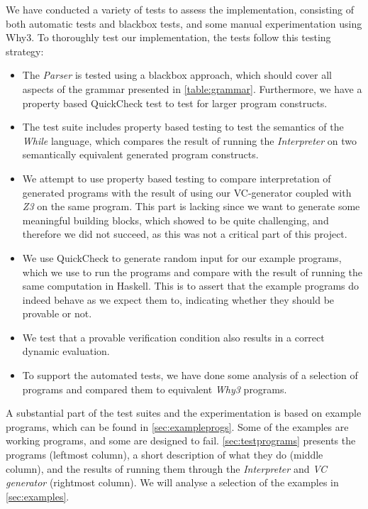 
We have conducted a variety of tests to assess the implementation, consisting of both automatic tests and blackbox tests, and some manual experimentation using Why3.
To thoroughly test our implementation, the tests follow this testing strategy:
\begin{itemize}
	\item The \textit{Parser} is tested using a blackbox approach, which should cover all aspects of the grammar presented in \cref{table:grammar}.
  Furthermore, we have a property based QuickCheck test to test for larger program constructs.
	\item The test suite includes property based testing to test the semantics of the \textit{While} language, which compares the result of running the \textit{Interpreter} on two semantically equivalent generated program constructs.
	\item We attempt to use property based testing to compare interpretation of generated programs with the result of using our VC-generator coupled with \textit{Z3} on the same program. This part is lacking since we want to generate some meaningful building blocks, which showed to be quite challenging, and therefore we did not succeed, as this was not a critical part of this project.
  \item We use QuickCheck to generate random input for our example programs, which we use to run the programs and compare with the result of running the same computation in Haskell. This is to assert that the example programs do indeed behave as we expect them to, indicating whether they should be provable or not.
	\item We test that a provable verification condition also results in a correct dynamic evaluation.
  \item To support the automated tests, we have done some analysis of a selection of programs and compared them to equivalent \textit{Why3} programs.
\end{itemize}

A substantial part of the test suites and the experimentation is based on example programs, which can be found in \cref{sec:exampleprogs}.
Some of the examples are working programs, and some are designed to fail.
\cref{sec:testprograms} presents the programs (leftmost column), a short description of what they do (middle column), and the results of running them through the \textit{Interpreter} and \textit{VC generator} (rightmost column).
We will analyse a selection of the examples in \cref{sec:examples}.

